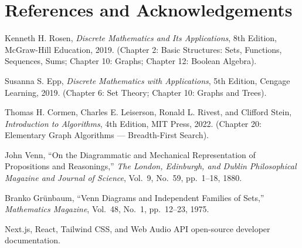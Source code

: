 \documentclass[11pt,a4paper]{article}
\begin{document}
\section{References and Acknowledgements}

\begin{enumerate}[label={[\arabic*]}]
  \item Kenneth H. Rosen, \textit{Discrete Mathematics and Its Applications}, 8th Edition, McGraw-Hill Education, 2019. (Chapter 2: Basic Structures: Sets, Functions, Sequences, Sums; Chapter 10: Graphs; Chapter 12: Boolean Algebra).
  \item Susanna S. Epp, \textit{Discrete Mathematics with Applications}, 5th Edition, Cengage Learning, 2019. (Chapter 6: Set Theory; Chapter 10: Graphs and Trees).
  \item Thomas H. Cormen, Charles E. Leiserson, Ronald L. Rivest, and Clifford Stein, \textit{Introduction to Algorithms}, 4th Edition, MIT Press, 2022. (Chapter 20: Elementary Graph Algorithms --- Breadth-First Search).
  \item John Venn, ``On the Diagrammatic and Mechanical Representation of Propositions and Reasonings,'' \textit{The London, Edinburgh, and Dublin Philosophical Magazine and Journal of Science}, Vol.~9, No.~59, pp.~1--18, 1880.
  \item Branko Gr{\"u}nbaum, ``Venn Diagrams and Independent Families of Sets,'' \textit{Mathematics Magazine}, Vol.~48, No.~1, pp.~12--23, 1975.
  \item Next.js, React, Tailwind CSS, and Web Audio API open-source developer documentation.
\end{enumerate}
\end{document}
